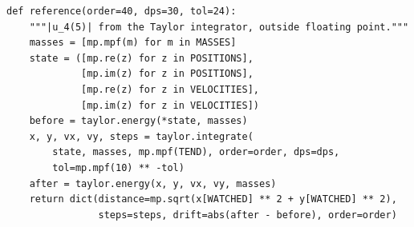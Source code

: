 \begin{verbatim}
def reference(order=40, dps=30, tol=24):
    """|u_4(5)| from the Taylor integrator, outside floating point."""
    masses = [mp.mpf(m) for m in MASSES]
    state = ([mp.re(z) for z in POSITIONS],
             [mp.im(z) for z in POSITIONS],
             [mp.re(z) for z in VELOCITIES],
             [mp.im(z) for z in VELOCITIES])
    before = taylor.energy(*state, masses)
    x, y, vx, vy, steps = taylor.integrate(
        state, masses, mp.mpf(TEND), order=order, dps=dps,
        tol=mp.mpf(10) ** -tol)
    after = taylor.energy(x, y, vx, vy, masses)
    return dict(distance=mp.sqrt(x[WATCHED] ** 2 + y[WATCHED] ** 2),
                steps=steps, drift=abs(after - before), order=order)
\end{verbatim}
